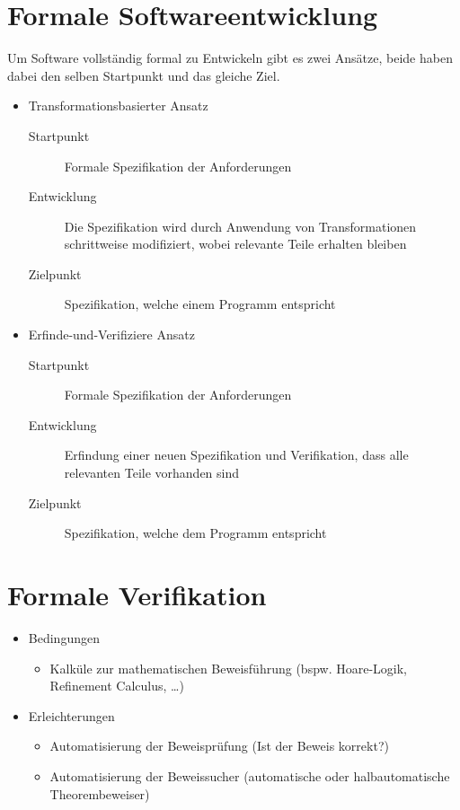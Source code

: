     \section{Formale Softwareentwicklung}
	    Um Software vollständig formal zu Entwickeln gibt es zwei Ansätze, beide haben dabei den selben Startpunkt und das gleiche Ziel.
	    \begin{itemize}
	    	\item Transformationsbasierter Ansatz
		    	\begin{description}
		    		\item[Startpunkt] Formale Spezifikation der Anforderungen
		    		\item[Entwicklung] Die Spezifikation wird durch Anwendung von Transformationen schrittweise modifiziert, wobei relevante Teile erhalten bleiben
		    		\item[Zielpunkt] Spezifikation, welche einem Programm entspricht
		    	\end{description}
	    	\item Erfinde-und-Verifiziere Ansatz
		    	\begin{description}
		    		\item[Startpunkt] Formale Spezifikation der Anforderungen
		    		\item[Entwicklung] Erfindung einer neuen Spezifikation und Verifikation, dass alle relevanten Teile vorhanden sind
		    		\item[Zielpunkt] Spezifikation, welche dem Programm entspricht
		    	\end{description}
	    \end{itemize}
    
    \section{Formale Verifikation}
	    \begin{itemize}
	    	\item Bedingungen
		    	\begin{itemize}
		    		\item Kalküle zur mathematischen Beweisführung (bspw. Hoare-Logik, Refinement Calculus, \dots)
		    	\end{itemize}
		    \item Erleichterungen
			    \begin{itemize}
			    	\item Automatisierung der Beweisprüfung (Ist der Beweis korrekt?)
			    	\item Automatisierung der Beweissucher (automatische oder halbautomatische Theorembeweiser)
			    \end{itemize}
	    \end{itemize}
    
